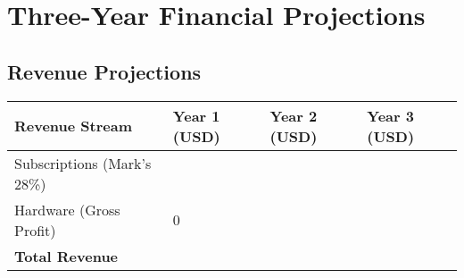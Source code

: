 
\section{Three-Year Financial Projections}

\subsection{Revenue Projections}
\begin{table}[H]
\centering
\begin{tabularx}{\linewidth}{l Y Y Y}
\toprule
Revenue Stream & Year 1 (USD) & Year 2 (USD) & Year 3 (USD) \\\midrule
Subscriptions (Mark's 28\%) & \numint{\subRevenueYearOne} & \numint{\subRevenueYearTwo} & \numint{\subRevenueYearThree} \\
Hardware (Gross Profit) & \num{0} & \numint{\hwWeightedAvgGP * \hwCustomersYearTwo} & \numint{\hwWeightedAvgGP * \hwCustomersYearThree} \\\midrule
\textbf{Total Revenue} & \textbf{\numint{\subRevenueYearOne}} & \textbf{\numint{\subRevenueYearTwo + \hwWeightedAvgGP * \hwCustomersYearTwo}} & \textbf{\numint{\subRevenueYearThree + \hwWeightedAvgGP * \hwCustomersYearThree}} \\
\bottomrule
\end{tabularx}
\end{table}

